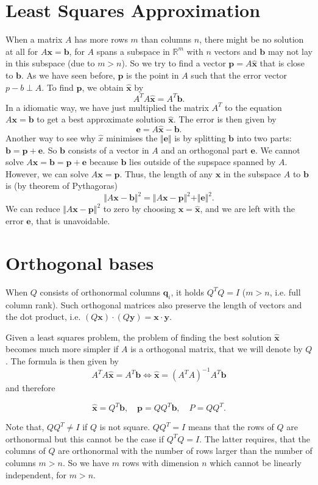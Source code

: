 \documentclass[a4paper, 11pt]{article}
\theoremstyle{plain}
\theoremstyle{definition}
\begin{document}
\section{Least Squares Approximation}
When a matrix $A$ has more rows $m$ than columns $n$, there might be no solution at all for $A\mathbf x = \mathbf b$, for $A$ spans a subspace in $\mathbb R^m$ with $n$ vectors and $\mathbf b$ may not lay in this subspace (due to $m > n$). So we try to find a vector $\mathbf p = A \mathbf{\hat x}$ that is close to $\mathbf b$. As we have seen before, $\mathbf p$ is the point in $A$ such that the error vector $p - b \perp A$. To find $\mathbf p$, we obtain $\mathbf{\hat x}$ by
\[
	A^TA \mathbf{\hat x} = A^T \mathbf b.
\]
In a idiomatic way, we have just multiplied the matrix $A^T$ to the equation $A\mathbf x = \mathbf b$ to get a best approximate solution $\mathbf{\hat x}$. The error is then given by
\[
	\mathbf e = A \mathbf{\hat x } - \mathbf b. 
\]
Another way to see why $\hat x$ minimises the $\Vert \mathbf e \Vert$ is by splitting $\mathbf b$ into two parts: $\mathbf b = \mathbf p + \mathbf e$. So $\mathbf b$ consists of a vector in $A$ and an orthogonal part $\mathbf e$. We cannot solve $A\mathbf x = \mathbf b = \mathbf p + \mathbf e$ because $\mathbf b$ lies outside of the supspace spanned by $A$. However, we can solve $A \mathbf{ x} = \mathbf p$. Thus, the length of any $\mathbf x$ in the subspace $A$ to $\mathbf b$ is (by theorem of Pythagoras)
\[
	\Vert A \mathbf x - \mathbf b \Vert ^2 = \Vert A\mathbf x - \mathbf p \Vert ^2 + \Vert \mathbf e \Vert^2.
\]
We can reduce $\Vert A\mathbf x - \mathbf p \Vert ^2$ to zero by choosing $\mathbf x = \mathbf{\hat x}$, and we are left with the error $\mathbf e$, that is unavoidable.

\section{Orthogonal bases}
When $Q$ consists of orthonormal columns $\mathbf q_i$, it holds $Q^TQ = I$ ($m > n$, i.e. full column rank). Such orthogonal matrices also preserve the length of vectors and the dot product, i.e. $(Q\mathbf x) \cdot (Q\mathbf y) = \mathbf x \cdot \mathbf y$.

Given a least squares problem, the problem of finding the best solution $\mathbf{\hat x}$ becomes much more simpler if $A$ is a orthogonal matrix, that we will denote by $Q$. The formula is then given by
\[
	A^TA\mathbf{\hat x} = A^T\mathbf b \iff \mathbf{\hat x} = (A^TA)^{-1}A^T\mathbf b
\]
and therefore
\begin{framed}
\[
	\mathbf{\hat x} = Q^T\mathbf b, \quad \mathbf p = QQ^T\mathbf b, \quad P = QQ^T.
\]
\end{framed}
Note that, $QQ^T \neq I$ if $Q$ is not square. $QQ^T = I$ means that the rows of $Q$ are orthonormal but this cannot be the case if $Q^T Q = I$. The latter requires, that the columns of $Q$ are orthonormal with the number of rows larger than the number of columns $m > n$. So we have $m$ rows with dimension $n$ which cannot be linearly independent, for $m > n$.
\end{document}
